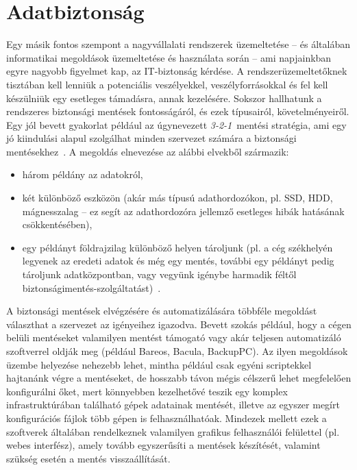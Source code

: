 \section{Adatbiztonság}
Egy másik fontos szempont a nagyvállalati rendszerek üzemeltetése -- és általában informatikai megoldások üzemeltetése és használata során -- ami napjainkban egyre nagyobb figyelmet kap, az IT-biztonság kérdése. A rendszerüzemeltetőknek tisztában kell lenniük a potenciális veszélyekkel, veszélyforrásokkal és fel kell készülniük egy esetleges támadásra, annak kezelésére. Sokszor hallhatunk a rendszeres biztonsági mentések fontosságáról, és ezek típusairól, követelményeiről. Egy jól bevett gyakorlat például az úgynevezett \textit{\mbox{3-2-1}}~mentési stratégia, ami egy jó kiindulási alapul szolgálhat minden szervezet számára a biztonsági mentésekhez~\cite{Backblaze321}.
A megoldás elnevezése az alábbi elvekből származik:
\begin{itemize}
	\item három példány az adatokról,
	\item két különböző eszközön (akár más típusú adathordozókon, pl. SSD, HDD, mágnesszalag -- ez segít az adathordozóra jellemző esetleges hibák hatásának csökkentésében),
	\item egy példányt földrajzilag különböző helyen tároljunk (pl. a cég székhelyén legyenek az eredeti adatok és még egy mentés, további egy példányt pedig tároljunk adatközpontban, vagy vegyünk igénybe harmadik féltől biztonságimentés-szolgáltatást)~\cite{Seagate321}.
\end{itemize}

A biztonsági mentések elvégzésére és automatizálására többféle megoldást választhat a szervezet az igényeihez igazodva. Bevett szokás például, hogy a cégen belüli mentéseket valamilyen mentést támogató vagy akár teljesen automatizáló szoftverrel oldják meg (például Bareos, Bacula, BackupPC). Az ilyen megoldások üzembe helyezése nehezebb lehet, mintha például csak egyéni scriptekkel hajtanánk végre a mentéseket, de hosszabb távon mégis célszerű lehet megfelelően konfigurálni őket, mert könnyebben kezelhetővé teszik egy komplex infrastruktúrában található gépek adatainak mentését, illetve az egyszer megírt konfigurációs fájlok több gépen is felhasználhatóak. Mindezek mellett ezek a szoftverek általában rendelkeznek valamilyen grafikus felhasználói felülettel (pl. webes interfész), amely tovább egyszerűsíti a mentések készítését, valamint szükség esetén a mentés visszaállítását.


